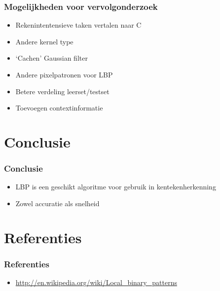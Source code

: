 \documentclass{beamer}
\begin{document}
    \begin{frame}
        \frametitle{Mogelijkheden voor vervolgonderzoek}

        \begin{itemize}
            \item Rekenintentensieve taken vertalen naar C
            \item Andere kernel type
            \item `Cachen' Gaussian filter
        \end{itemize}

        \begin{itemize}
            \item Andere pixelpatronen voor LBP
            \item Betere verdeling leerset/testset
            \item Toevoegen contextinformatie
        \end{itemize}
    \end{frame}

    \section{Conclusie}

    \begin{frame}
        \frametitle{Conclusie}

        \begin{itemize}
            \item LBP is een geschikt algoritme voor gebruik in
            kentekenherkenning
            \item Zowel accuratie als snelheid
        \end{itemize}
    \end{frame}

    \section{Referenties}

    \begin{frame}
        \frametitle{Referenties}

        \begin{itemize}
            \item \url{http://en.wikipedia.org/wiki/Local\_binary\_patterns}
        \end{itemize}
    \end{frame}
\end{document}
